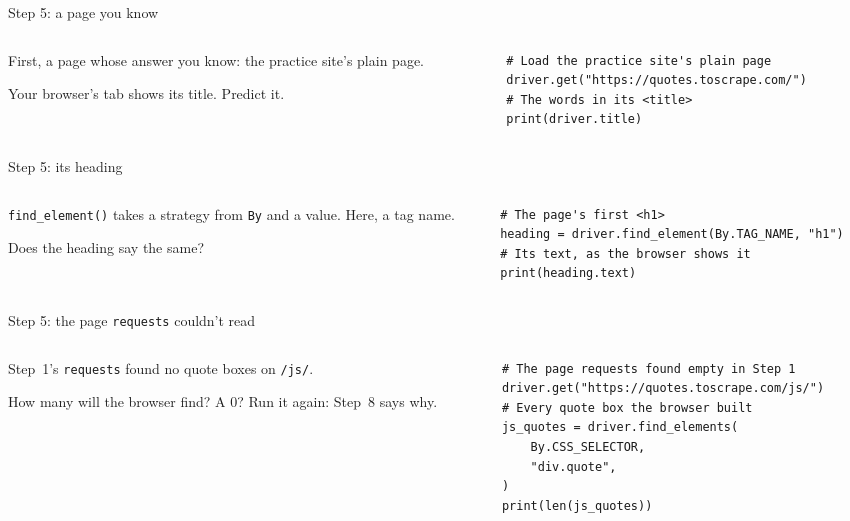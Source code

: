 \documentclass[9pt,aspectratio=169]{beamer}
\begin{document}
\begin{frame}[fragile]{Step 5: a page you know}
    \begin{columns}[T]
        \begin{column}{0.37\textwidth}
            First, a page whose answer you know: the practice site's plain page.

            \medskip
            Your browser's tab shows its title. Predict it.
        \end{column}
        \begin{column}{0.6\textwidth}
\begin{lstlisting}[style=lab]
# Load the practice site's plain page
driver.get("https://quotes.toscrape.com/")
# The words in its <title>
print(driver.title)
\end{lstlisting}
        \end{column}
    \end{columns}
\end{frame}

\begin{frame}[fragile]{Step 5: its heading}
    \begin{columns}[T]
        \begin{column}{0.37\textwidth}
            \texttt{find\_element()} takes a strategy from \texttt{By} and a value. Here, a tag name.

            \medskip
            Does the heading say the same?
        \end{column}
        \begin{column}{0.6\textwidth}
\begin{lstlisting}[style=lab]
# The page's first <h1>
heading = driver.find_element(By.TAG_NAME, "h1")
# Its text, as the browser shows it
print(heading.text)
\end{lstlisting}
        \end{column}
    \end{columns}
\end{frame}

\begin{frame}[fragile]{Step 5: the page \texttt{requests} couldn't read}
    \begin{columns}[T]
        \begin{column}{0.37\textwidth}
            Step~1's \texttt{requests} found no quote boxes on \texttt{/js/}.

            \medskip
            How many will the browser find? A 0? Run it again: Step~8 says why.
        \end{column}
        \pause
        \begin{column}{0.6\textwidth}
\begin{lstlisting}[style=lab]
# The page requests found empty in Step 1
driver.get("https://quotes.toscrape.com/js/")
# Every quote box the browser built
js_quotes = driver.find_elements(
    By.CSS_SELECTOR,
    "div.quote",
)
print(len(js_quotes))
\end{lstlisting}
        \end{column}
    \end{columns}
\end{frame}
\end{document}
